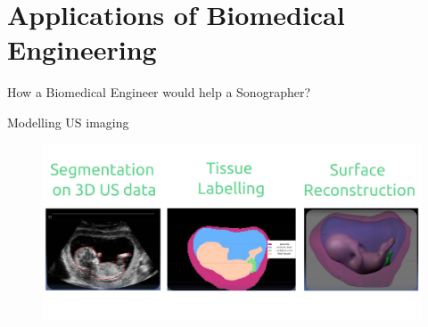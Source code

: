 \section{Applications of Biomedical Engineering}


{
\begin{frame}{}

\BigSizeFont
\begin{center}
    How a Biomedical Engineer would help a Sonographer?
\end{center}

\end{frame}
}

{


\begin{frame}{Modelling US imaging}
      \begin{figure}
        \centering
        \includegraphics[width=1.0\textwidth]{./../figures/modelling-us-imaging/versions/drawing-v03}
      \end{figure}
\end{frame}
}




%
%




